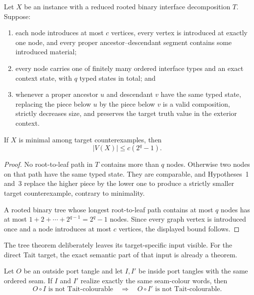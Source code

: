 \begin{theorem}
\label{thm:finite-tree-interface-pumping}
Let \(X\) be an instance with a reduced rooted binary interface decomposition
\(T\).  Suppose:
\begin{enumerate}
\item each node introduces at most \(c\) vertices, every vertex is introduced
at exactly one node, and every proper ancestor--descendant segment contains
some introduced material;
\item every node carries one of finitely many ordered interface types and an
exact context state, with \(q\) typed states in total; and
\item whenever a proper ancestor \(u\) and descendant \(v\) have the same
typed state, replacing the piece below \(u\) by the piece below \(v\) is a
valid composition, strictly decreases size, and preserves the target truth
value in the exterior context.
\end{enumerate}
If \(X\) is minimal among target counterexamples, then
\[
                         |V(X)|\le c(2^q-1).
\]
\end{theorem}

\begin{proof}
No root-to-leaf path in \(T\) contains more than \(q\) nodes.  Otherwise two
nodes on that path have the same typed state.  They are comparable, and
Hypotheses~1 and~3 replace the higher piece by the lower one to produce a
strictly smaller target counterexample, contrary to minimality.

A rooted binary tree whose longest root-to-leaf path contains at most \(q\)
nodes has at most
\(1+2+\cdots+2^{q-1}=2^q-1\) nodes.  Since every graph vertex is introduced
once and a node introduces at most \(c\) vertices, the displayed bound
follows.
\end{proof}

The tree theorem deliberately leaves its target-specific input visible.  For
the direct Tait target, the exact semantic part of that input is already a
theorem.

\begin{theorem}
\label{thm:closed-count-support-replacement}
Let \(O\) be an outside port tangle and let \(I,I'\) be inside port tangles
with the same ordered seam.  If \(I\) and \(I'\) realize exactly the same
seam-colour words, then
\[
  O\circ I\text{ is not Tait-colourable}
  \quad\Longrightarrow\quad
  O\circ I'\text{ is not Tait-colourable}.
\]
\end{theorem}

